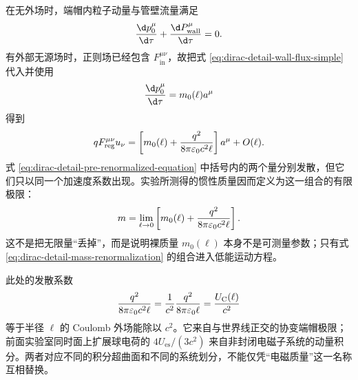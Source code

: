 在无外场时，端帽内粒子动量与管壁流量满足
\begin{equation*}
 {\d p_0^\mu\over\d\tau}
 +{\d P_{\mathrm{wall}}^\mu\over\d\tau}=0.
\end{equation*}
有外部无源场时，正则场已经包含 $F_{\mathrm{in}}^{\mu\nu}$，故把式 \eqref{eq:dirac-detail-wall-flux-simple} 代入并使用
\begin{equation*}
 {\d p_0^\mu\over\d\tau}=m_0(\ell)a^\mu
\end{equation*}
得到
\begin{equation}
 qF_{\mathrm{reg}}^{\mu\nu}u_\nu
 =\left[
 m_0(\ell)
 +{q^2\over8\pi\varepsilon_0c^2\ell}
 \right]a^\mu+O(\ell).
 \label{eq:dirac-detail-pre-renormalized-equation}
\end{equation}
式 \eqref{eq:dirac-detail-pre-renormalized-equation} 中括号内的两个量分别发散，但它们只以同一个加速度系数出现。实验所测得的惯性质量因而定义为这一组合的有限极限：
\begin{equation}
 m
 =\lim_{\ell\to0}
 \left[
 m_0(\ell)
 +{q^2\over8\pi\varepsilon_0c^2\ell}
 \right].
 \label{eq:dirac-detail-mass-renormalization}
\end{equation}
这不是把无限量“丢掉”，而是说明裸质量 $m_0(\ell)$ 本身不是可测量参数；只有式 \eqref{eq:dirac-detail-mass-renormalization} 的组合进入低能运动方程。

此处的发散系数
\begin{equation*}
 {q^2\over8\pi\varepsilon_0c^2\ell}
 ={1\over c^2}{q^2\over8\pi\varepsilon_0\ell}
 ={U_{\mathrm C}(\ell)\over c^2}
\end{equation*}
等于半径 $\ell$ 的 Coulomb 外场能除以 $c^2$。它来自与世界线正交的协变端帽极限；前面实验室同时面上扩展球电荷的 $4U_{\mathrm{es}}/(3c^2)$ 来自非封闭电磁子系统的动量积分。两者对应不同的积分超曲面和不同的系统划分，不能仅凭“电磁质量”这一名称互相替换。

